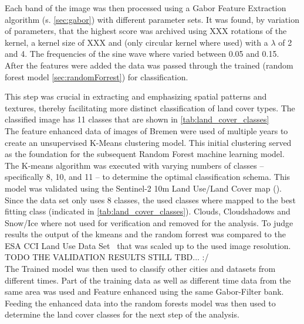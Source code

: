 \documentclass[12pt,a4paper, english]{article}
\begin{document}
    Each band of the image was then processed using a Gabor Feature Extraction algorithm (s. \cref{sec:gabor}) with different parameter sets. 
    It was found, by variation of parameters, that the highest score was archived using XXX 
    rotations of the kernel, a kernel size of XXX
    and (only circular kernel where used) with a $\lambda$ of 2 and 4. %
    The frequencies of the sine wave where varied between 0.05 and 0.15. \\ 
    After the features were added the data was passed through the trained (random forest model \cref{sec:randomForrest}) for classification. 

This step was crucial in extracting and emphasizing spatial patterns and textures, thereby facilitating more distinct classification of land cover types. %
The classified image has 11 classes that are shown in \cref{tab:land_cover_classes}
\\
The feature enhanced data of images of Bremen%
were used of multiple years to create an unsupervised K-Means clustering model.%
This initial clustering served as the foundation for the subsequent Random Forest machine learning model.
The K-means algorithm was executed with varying numbers of classes – specifically 8, 10, and 11 – to determine the optimal classification schema.
This model was validated using the Sentinel-2 10m Land Use/Land Cover map (\cite{Zhang}).
Since the data set only uses 8 classes, the used classes where mapped to the best fitting class (indicated in \cref{tab:land_cover_classes}). 
Clouds, Cloudshadows and Snow/Ice where not used for verification and removed for the analysis.
To judge results the output of the kmeans and the random forrest was compared to the ESA CCI Land Use Data Set~\cite{landformclassicationusingfuzzykmeans2000} that was scaled up to the used image resolution. %
\\
TODO THE VALIDATION RESULTS STILL TBD... :/ 
\\ 
The Trained model was then used to classify other cities and datasets from different times. 
Part of the training data as well as different time data from the same area was used and Feature enhanced using the same Gabor-Filter bank.
Feeding the enhanced data into the random forests model was then used to determine the land cover classes for the next step of the analysis.
\end{document}
